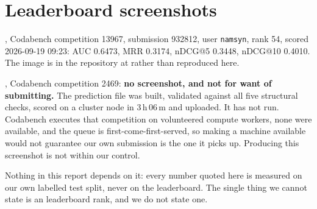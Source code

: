 \section{Leaderboard screenshots}
\label{app:screenshots}

\mind{}, Codabench competition 13967, submission 932812, user \texttt{namsyn}, rank 54,
scored 2026-09-19 09:23: AUC 0.6473, MRR 0.3174, nDCG@5 0.3448, nDCG@10 0.4010. The image is
in the repository at  rather than
reproduced here.

\eb{}, Codabench competition 2469: \textbf{no screenshot, and not for want of submitting.} The
prediction file was built, validated against all five structural checks, scored on a cluster node
in 3\,h\,06\,m and uploaded. It has not run. Codabench executes that competition on volunteered
compute workers, none were available, and the queue is first-come-first-served, so making a
machine available would not guarantee our own submission is the one it picks up. Producing this
screenshot is not within our control.

Nothing in this report depends on it: every \eb{} number quoted here is measured on our own
labelled test split, never on the leaderboard. The single thing we cannot state is an \eb{}
leaderboard rank, and we do not state one.
